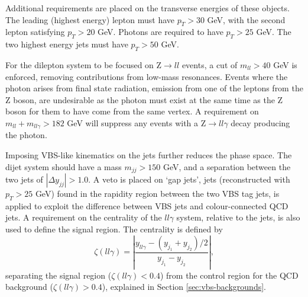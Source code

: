 
Additional requirements are placed on the transverse energies of these objects.
The leading (highest energy) lepton must have $p_T > 30$ GeV, with the second
lepton satisfying $p_T > 20$ GeV. Photons are required to have $p_T > 25$ GeV.
The two highest energy jets must have $p_T > 50$ GeV.

For the dilepton system to be focused on Z$\to ll$ events, a cut of $m_{ll} >
40$ GeV is enforced, removing contributions from low-mass resonances. Events
where the photon arises from final state radiation, emission from one of the
leptons from the Z boson, are undesirable as the photon must exist at the same
time as the Z boson for them to have come from the same vertex. A requirement
on $m_{ll} + m_{ll\gamma} > 182$ GeV will suppress any events with a Z$\to
ll\gamma$ decay producing the photon.

Imposing \ac{VBS}-like kinematics on the jets further reduces the phase space.
The dijet system should have a mass $m_{jj} > 150$ GeV, and a separation between
the two jets of $|\Delta y_{jj}| > 1.0$. A veto is placed on `gap jets', jets
(reconstructed with $p_T > 25$ GeV) found in the rapidity region between the two
VBS tag jets, is applied to exploit the difference between VBS jets and
colour-connected \ac{QCD} jets.  A requirement on the centrality of the
$ll\gamma$ system, relative to the jets, is also used to define the signal
region. The centrality is defined by
%
\begin{equation*}
  \zeta(ll\gamma) = \left|
                      \frac { y_{ll\gamma} - (y_{j_1} + y_{j_2})/2}
                            { y_{j_1} - y_{j_2} }
                    \right|,
\end{equation*}
%
separating the signal region ($\zeta(ll\gamma) < 0.4$) from the control region
for the \ac{QCD} background ($\zeta(ll\gamma) > 0.4$), explained in
Section \ref{sec:vbs-backgrounds}.
